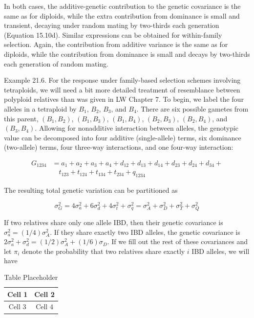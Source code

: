\documentclass{article}
\begin{document}
In both cases, the additive-genetic contribution to the genetic covariance is the same as for diploids, while the extra contribution from dominance is small and transient, decaying under random mating by two-thirds each generation (Equation 15.10d). Similar expressions can be obtained for within-family selection. Again, the contribution from additive variance is the same as for diploids, while the contribution from dominance is small and decays by two-thirds each generation of random mating.

Example 21.6. For the response under family-based selection schemes involving tetraploids, we will need a bit more detailed treatment of resemblance between polyploid relatives than was given in LW Chapter 7. To begin, we label the four alleles in a tetraploid by  $ B_1 $,  $ B_2 $,  $ B_3 $, and  $ B_4 $. There are six possible gametes from this parent,  $ (B_1, B_2) $,  $ (B_1, B_3) $,  $ (B_1, B_4) $,  $ (B_2, B_3) $,  $ (B_2, B_4) $, and  $ (B_3, B_4) $. Allowing for nonadditive interaction between alleles, the genotypic value can be decomposed into four additive (single-allele) terms, six dominance (two-allele) terms, four three-way interactions, and one four-way interaction:

\begin{equation}
\begin{aligned}G_{1234}&=a_{1}+a_{2}+a_{3}+a_{4}+d_{12}+d_{13}+d_{14}+d_{23}+d_{24}+d_{34}+\\&\quad t_{123}+t_{124}+t_{134}+t_{234}+q_{1234}\end{aligned}
\tag{21.34a}
\label{eq:21_34a}
\end{equation}

The resulting total genetic variation can be partitioned as

\begin{equation}
\sigma_{G}^{2}=4\sigma_{a}^{2}+6\sigma_{d}^{2}+4\sigma_{t}^{2}+\sigma_{q}^{2}=\sigma_{A}^{2}+\sigma_{D}^{2}+\sigma_{T}^{2}+\sigma_{Q}^{2}
\tag{21.34b}
\label{eq:21_34b}
\end{equation}

If two relatives share only one allele IBD, then their genetic covariance is  $ \sigma_a^2 = (1/4)\sigma_A^2 $. If they share exactly two IBD alleles, the genetic covariance is  $ 2\sigma_a^2 + \sigma_d^2 = (1/2)\sigma_A^2 + (1/6)\sigma_D $. If we fill out the rest of these covariances and let  $ \pi_i $ denote the probability that two relatives share exactly  $ i $ IBD alleles, we will have

\begin{table}[h]
\centering
\begin{tabular}{|c|c|}
\hline
Cell 1 & Cell 2 \\
\hline
Cell 3 & Cell 4 \\
\hline
\end{tabular}
\caption{Table Placeholder}
\end{table}
\end{document}
